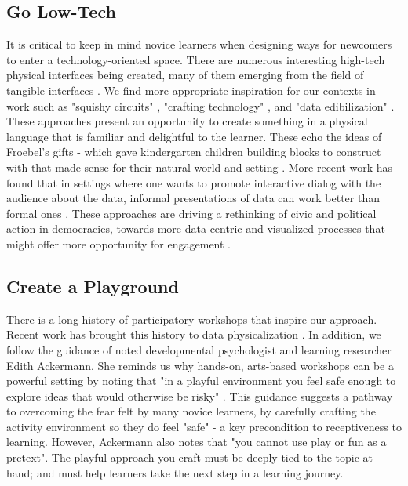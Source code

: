 \documentclass{sigchi-ext}
\begin{document}
\subsection{Go Low-Tech}

It is critical to keep in mind novice learners when designing ways for newcomers to enter a technology-oriented space. There are numerous interesting high-tech physical interfaces being created, many of them emerging from the field of tangible interfaces \cite{Ishii_2008, Houben_2016, Taher_Hardy_2015}. We find more appropriate inspiration for our contexts in work such as "squishy circuits" \cite{Johnson_Thomas_2010}, "crafting technology" \cite{Buechley_Perner_2012}, and "data edibilization" \cite{Wang_Ma_Luo_Qu_2016}. These approaches present an opportunity to create something in a physical language that is familiar and delightful to the learner.  These echo the ideas of Froebel's gifts - which gave kindergarten children building blocks to construct with that made sense for their natural world and setting \cite{Fröbel_1885}. More recent work has found that in settings where one wants to promote interactive dialog with the audience about the data, informal presentations of data can work better than formal ones \cite{Bhargava_Kadouaki_Bhargava_Castro_DIgnazio_2016, Wood_Isenberg_Isenberg_Dykes_Boukhelifa_Slingsby_2012}. These approaches are driving a rethinking of civic and political action in democracies, towards more data-centric and visualized processes that might offer more opportunity for engagement \cite{Bohman_2015, Zhao_Moere_2008, Jansen_2015}.

\subsection{Create a Playground}

There is a long history of participatory workshops that inspire our approach. Recent work has brought this history to data physicalization \cite{Huron_Carpendale_Boy_Fekete_2016}.  In addition, we follow the guidance of noted developmental psychologist and learning researcher Edith Ackermann.  She reminds us why hands-on, arts-based workshops can be a powerful setting by noting that "in a playful environment you feel safe enough to explore ideas that would otherwise be risky" \cite{Ackermann_2014}. This guidance suggests a pathway to overcoming the fear felt by many novice learners, by carefully crafting the activity environment so they do feel "safe" - a key precondition to receptiveness to learning. However, Ackermann  also notes that "you cannot use play or fun as a pretext". The playful approach you craft must be deeply tied to the topic at hand; and must help learners take the next step in a learning journey.
\end{document}
